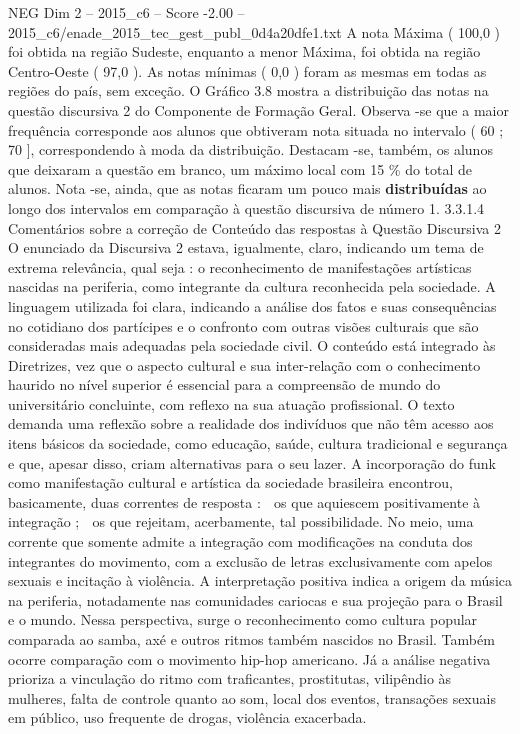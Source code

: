 \begin{textsample}{NEG Dim 2 – 2015\_c6 – Score -2.00 – 2015\_c6/enade\_2015\_tec\_gest\_publ\_0d4a20dfe1.txt}
A nota Máxima ( 100,0 ) foi obtida na região Sudeste, enquanto a menor Máxima, foi obtida na região Centro-Oeste ( 97,0 ).
As notas mínimas ( 0,0 ) foram as mesmas em todas as regiões do país, sem exceção.
O Gráfico 3.8 mostra a distribuição das notas na questão discursiva 2 do Componente de Formação Geral.
Observa -se que a maior frequência corresponde aos alunos que obtiveram nota situada no intervalo ( 60 ; 70 ], correspondendo à moda da distribuição.
Destacam -se, também, os alunos que deixaram a questão em branco, um máximo local com 15 \% do total de alunos.
Nota -se, ainda, que as notas ficaram um pouco mais \textbf{distribuídas} ao longo dos intervalos em comparação à questão discursiva de número 1. 3.3.1.4 Comentários sobre a correção de Conteúdo das respostas à Questão Discursiva 2 O enunciado da Discursiva 2 estava, igualmente, claro, indicando um tema de extrema relevância, qual seja : o reconhecimento de manifestações artísticas nascidas na periferia, como integrante da cultura reconhecida pela sociedade.
A linguagem utilizada foi clara, indicando a análise dos fatos e suas consequências no cotidiano dos partícipes e o confronto com outras visões culturais que são consideradas mais adequadas pela sociedade civil.
O conteúdo está integrado às Diretrizes, vez que o aspecto cultural e sua inter-relação com o conhecimento haurido no nível superior é essencial para a compreensão de mundo do universitário concluinte, com reflexo na sua atuação profissional.
O texto demanda uma reflexão sobre a realidade dos indivíduos que não têm acesso aos itens básicos da sociedade, como educação, saúde, cultura tradicional e segurança e que, apesar disso, criam alternativas para o seu lazer.
A incorporação do funk como manifestação cultural e artística da sociedade brasileira encontrou, basicamente, duas correntes de resposta :  os que aquiescem positivamente à integração ;  os que rejeitam, acerbamente, tal possibilidade.
No meio, uma corrente que somente admite a integração com modificações na conduta dos integrantes do movimento, com a exclusão de letras exclusivamente com apelos sexuais e incitação à violência.
A interpretação positiva indica a origem da música na periferia, notadamente nas comunidades cariocas e sua projeção para o Brasil e o mundo.
Nessa perspectiva, surge o reconhecimento como cultura popular comparada ao samba, axé e outros ritmos também nascidos no Brasil.
Também ocorre comparação com o movimento hip-hop americano.
Já a análise negativa prioriza a vinculação do ritmo com traficantes, prostitutas, vilipêndio às mulheres, falta de controle quanto ao som, local dos eventos, transações sexuais em público, uso frequente de drogas, violência exacerbada.

\end{textsample}
